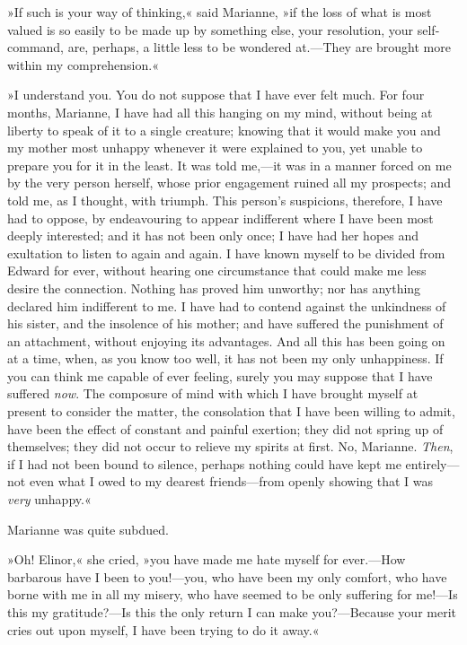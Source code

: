 »If such is your way of thinking,« said Marianne, »if the loss of what is most valued is so easily to be made up by something else, your resolution, your self-command, are, perhaps, a little less to be wondered at.—They are brought more within my comprehension.«

»I understand you. You do not suppose that I have ever felt much. For four months, Marianne, I have had all this hanging on my mind, without being at liberty to speak of it to a single creature; knowing that it would make you and my mother most unhappy whenever it were explained to you, yet unable to prepare you for it in the least. It was told me,—it was in a manner forced on me by the very person herself, whose prior engagement ruined all my prospects; and told me, as I thought, with triumph. This person’s suspicions, therefore, I have had to oppose, by endeavouring to appear indifferent where I have been most deeply interested; and it has not been only once; I have had her hopes and exultation to listen to again and again. I have known myself to be divided from Edward for ever, without hearing one circumstance that could make me less desire the connection. Nothing has proved him unworthy; nor has anything declared him indifferent to me. I have had to contend against the unkindness of his sister, and the insolence of his mother; and have suffered the punishment of an attachment, without enjoying its advantages. And all this has been going on at a time, when, as you know too well, it has not been my only unhappiness. If you can think me capable of ever feeling, surely you may suppose that I have suffered \textit{now}. The composure of mind with which I have brought myself at present to consider the matter, the consolation that I have been willing to admit, have been the effect of constant and painful exertion; they did not spring up of themselves; they did not occur to relieve my spirits at first. No, Marianne. \textit{Then}, if I had not been bound to silence, perhaps nothing could have kept me entirely—not even what I owed to my dearest friends—from openly showing that I was \textit{very} unhappy.«

Marianne was quite subdued.

»Oh! Elinor,« she cried, »you have made me hate myself for ever.—How barbarous have I been to you!—you, who have been my only comfort, who have borne with me in all my misery, who have seemed to be only suffering for me!—Is this my gratitude?—Is this the only return I can make you?—Because your merit cries out upon myself, I have been trying to do it away.«

